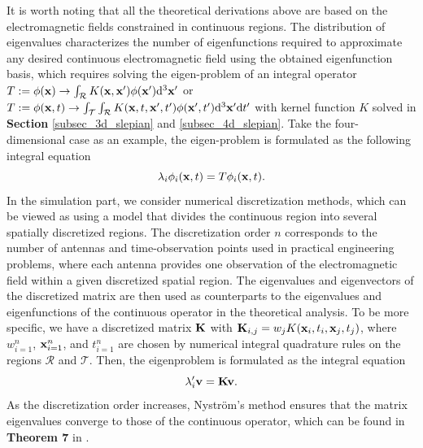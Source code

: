 \documentclass[12pt,draftclsnofoot,journal,onecolumn]{IEEEtran}
\begin{document}
	{\color{red}
	It is worth noting that all the theoretical derivations above are based on the electromagnetic fields constrained in continuous regions. The distribution of eigenvalues characterizes the number of eigenfunctions required to approximate any desired continuous electromagnetic field using the obtained eigenfunction basis, which requires solving the eigen-problem of an integral operator $T := \phi({\bf x}) \rightarrow \int_{\mathcal{R}} K({\bf x},{\bf x}')\phi({\bf x}') {\rm d}^3 {\bf x}'$ or $T := \phi({\bf x},t) \rightarrow \int_{\mathcal{T}}\int_{\mathcal{R}} K({\bf x},t,{\bf x}',t')\phi({\bf x}',t') {\rm d}^3 {\bf x}'{\rm d} {t}'$ with kernel function $K$ solved in {\bf Section} \ref{subsec_3d_slepian} and \ref{subsec_4d_slepian}. Take the four-dimensional case as an example, the eigen-problem is formulated as the following integral equation
	\begin{equation}
		\lambda_i \phi_i({\bf x},t) = T \phi_i({\bf x},t).
	\end{equation}
	In the simulation part, we consider numerical discretization methods, which can be viewed as using a model that divides the continuous region into several spatially discretized regions. The discretization order $n$ corresponds to the number of antennas and time-observation points used in practical engineering problems, where each antenna provides one observation of the electromagnetic field within a given discretized spatial region. The eigenvalues and eigenvectors of the discretized matrix are then used as counterparts to the eigenvalues and eigenfunctions of the continuous operator in the theoretical analysis. To be more specific, we have a discretized matrix ${\bf K}$ with ${\bf K}_{i,j} = w_j K({\bf x}_i,t_i,{\bf x}_j,t_j)$, where ${w}_{i=1}^n$, ${\bf x}_{i=1}^n$, and $t_{i=1}^n$ are chosen by numerical integral quadrature rules on the regions $\mathcal{R}$ and $\mathcal{T}$. Then, the eigenproblem is formulated as the integral equation
	\begin{equation}
		\lambda'_i {\bf v} = {\bf K} {\bf v}.
	\end{equation}
	As the discretization order increases, Nyström’s method ensures that the matrix eigenvalues converge to those of the continuous operator, which can be found in {\bf Theorem 7} in \cite{spence1975convergence}. 
	}
	
\end{document}
